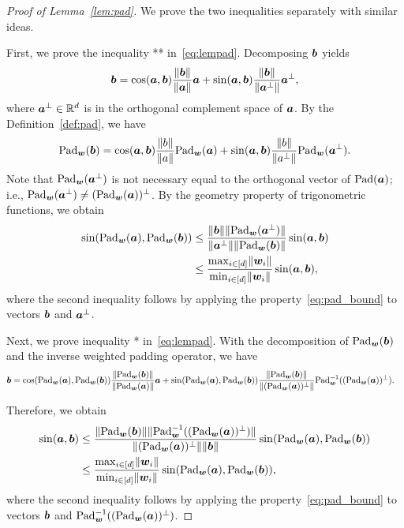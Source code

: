 \documentclass[lettersize,onecolumn,journal]{IEEEtran}
\theoremstyle{definition}
\theoremstyle{definition}
\begin{document}
\begin{proof}[Proof of Lemma~\ref{lem:pad}] We prove the two inequalities separately with similar ideas.

First, we prove the inequality ** in~\eqref{eq:lempad}. Decomposing $\bm{b}$ yields
\begin{equation}
    \bm{b} = \cos (\bm{a}, \bm{b}) \frac{\lVert\bm{b}\rVert}{\lVert\bm{a}\rVert} \bm{a} + \sin (\bm{a}, \bm{b}) \frac{\lVert\bm{b}\rVert}{\lVert\bm{a}^{\perp}\rVert}\bm{a}^{\perp},
\end{equation}
where $\bm{a}^{\perp} \in \mathbb{R}^d$ is in the orthogonal complement space of $\bm{a}$. By the Definition~\ref{def:pad}, we have 
\begin{equation}\label{eq:pad_second_ineq}
    \pad_{\mw}(\mb) = \cos (\ma, \mb) \frac{\onormSize{}{b}}{\onormSize{}{a}} \pad_{\mw}(\ma) + \sin (\ma, \mb) \frac{\onormSize{}{b}}{\onormSize{}{a^{\perp}}} \pad_{\mw}(\ma^{\perp}).
\end{equation}
Note that $\text{Pad}_{\bm{w}}(\bm{a}^{\perp})$ is not necessary equal to the orthogonal vector of $\text{Pad}(\bm{a})$; i.e., $\text{Pad}_{\bm{w}}(\bm{a}^{\perp}) \neq (\text{Pad}_{\bm{w}}(\bm{a}))^{\perp}$. By the geometry property of trigonometric functions, we obtain
\begin{align}
    \sin(\text{Pad}_{\bm{w}}(\bm{a}),  \text{Pad}_{\bm{w}}(\bm{b}))  &\leq \frac{  \lVert\bm{b}\rVert \lVert\text{Pad}_{\bm{w}}(\bm{a}^{\perp})\rVert }{ \lVert\bm{a}^{\perp}\rVert \lVert \text{Pad}_{\bm{w}}(\bm{b})\rVert} \sin (\bm{a}, \bm{b})  \\
    & \leq  \frac{ \max_{i \in [d]} \lVert\bm{w}_i\rVert }{\min_{i \in [d]} \lVert\bm{w}_i\rVert} \sin (\bm{a}, \bm{b}),
\end{align}
where the second inequality follows by applying the property~\eqref{eq:pad_bound} to vectors $\bm{b}$ and $\bm{a}^{\perp}$. 

Next, we prove inequality * in~\eqref{eq:lempad}. With the decomposition of $\text{Pad}_{\bm{w}}(\bm{b})$ and the inverse weighted padding operator, we have 
\begin{align}
    \bm{b} &=  \cos(\text{Pad}_{\bm{w}}(\bm{a}), \text{Pad}_{\bm{w}}(\bm{b})) \frac{\lVert\text{Pad}_{\bm{w}}(\bm{b})\rVert}{\lVert\text{Pad}_{\bm{w}}(\bm{a})\rVert} \bm{a} +  \sin(\text{Pad}_{\bm{w}}(\bm{a}), \text{Pad}_{\bm{w}}(\bm{b}))\frac{\lVert\text{Pad}_{\bm{w}}(\bm{b})\rVert}{\lVert(\text{Pad}_{\bm{w}}(\bm{a}))^{\perp}\rVert} \text{Pad}_{\bm{w}}^{-1}((\text{Pad}_{\bm{w}}(\bm{a}))^{\perp}).
\end{align}

Therefore, we obtain 
\begin{align}
    \sin(\bm{a}, \bm{b}) &\leq \frac{ \lVert\text{Pad}_{\bm{w}}(\bm{b}) \rVert \lVert\text{Pad}_{\bm{w}}^{-1}((\text{Pad}_{\bm{w}}(\bm{a}))^{\perp})  \rVert }{ \lVert(\text{Pad}_{\bm{w}}(\bm{a}))^{\perp} \rVert \lVert\bm{b}\rVert }  \sin(\text{Pad}_{\bm{w}}(\bm{a}), \text{Pad}_{\bm{w}}(\bm{b}))\\
    & \leq \frac{ \max_{i \in [d]} \lVert\bm{w}_i\rVert }{\min_{i \in [d]} \lVert\bm{w}_i\rVert} \sin(\text{Pad}_{\bm{w}}(\bm{a}), \text{Pad}_{\bm{w}}(\bm{b})),
\end{align}
where the second inequality follows by applying the property~\eqref{eq:pad_bound} to vectors $\bm{b}$ and $\text{Pad}_{\bm{w}}^{-1}((\text{Pad}_{\bm{w}}(\bm{a}))^{\perp})$.
\end{proof}
\end{document}

